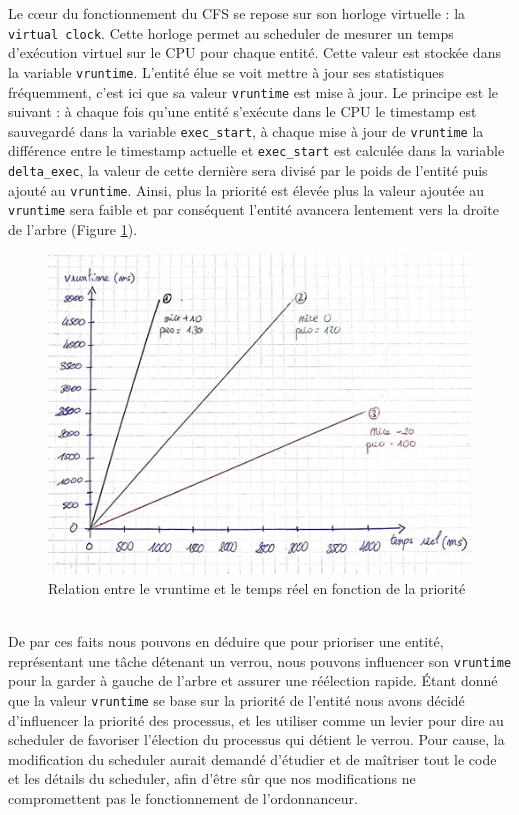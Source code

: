 Le cœur du fonctionnement du CFS se repose sur son horloge virtuelle : la
\verb|virtual clock|. Cette horloge permet au scheduler de mesurer un temps
d'exécution virtuel sur le CPU pour chaque entité. Cette valeur est stockée dans
la variable \verb|vruntime|. L'entité élue se voit mettre à jour ses statistiques
fréquemment, c'est ici que sa valeur \verb|vruntime| est mise à jour. Le
principe est le suivant : à chaque fois qu'une entité s'exécute dans le CPU le
timestamp est sauvegardé dans la variable \verb|exec_start|, à chaque mise à
jour de \verb|vruntime| la différence entre le timestamp actuelle et
\verb|exec_start| est calculée dans la variable \verb|delta_exec|, la valeur de
cette dernière sera divisé par le poids de l'entité puis ajouté au
\verb|vruntime|. Ainsi, plus la priorité est élevée plus la valeur ajoutée au
\verb|vruntime| sera faible et par conséquent l'entité avancera lentement vers
la droite de l'arbre (Figure \ref{fig:sched}).
\begin{figure}[h!]
	\centering
	\includegraphics[scale=0.6]{include/schema_sched.jpg}
	\caption{Relation entre le vruntime et le temps réel en fonction de la priorité}
	\label{fig:sched}
\end{figure}
\\

De par ces faits nous pouvons en déduire que pour prioriser une entité, 
représentant une tâche détenant un verrou, nous pouvons influencer son 
\verb|vruntime| pour la garder à gauche de l'arbre et assurer une réélection 
rapide. Étant donné que la valeur \verb|vruntime| se base sur la priorité de 
l'entité nous avons décidé d'influencer la priorité des processus, et 
les utiliser comme un levier pour dire au scheduler de favoriser l'élection 
du processus qui détient le verrou. Pour cause, la modification du scheduler aurait
demandé d'étudier et de maîtriser tout le code et les détails du scheduler, afin
d'être sûr que nos modifications ne compromettent pas le fonctionnement de
l'ordonnanceur.